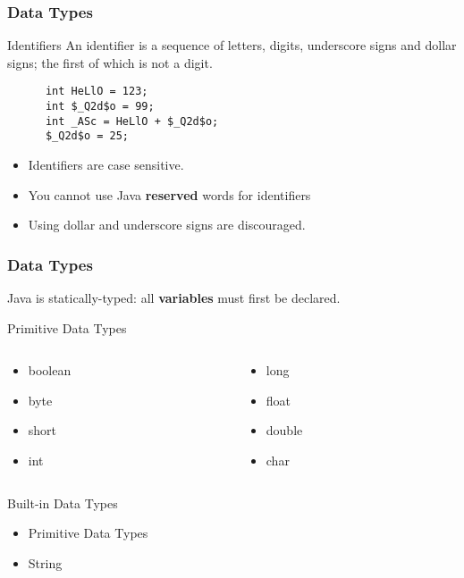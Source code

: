 \documentclass[10pt, compress]{beamer}
\begin{document}
\begin{frame}[fragile]
  \frametitle{Data Types}
  \begin{block}{Identifiers}
    An identifier is a sequence of letters, digits, underscore signs and dollar signs; the first of which is not a digit.
    \begin{verbatim}
      int HeLlO = 123;
      int $_Q2d$o = 99;
      int _ASc = HeLlO + $_Q2d$o;
      $_Q2d$o = 25;
    \end{verbatim}
  \end{block}
  \begin{itemize}
    \item[] Identifiers are case sensitive.
    \item[] You cannot use Java \textbf{reserved} words for identifiers
    \item[] Using dollar and underscore signs are discouraged.
  \end{itemize}
\end{frame}

\begin{frame}[fragile]
  \frametitle{Data Types}
  Java is statically-typed: all \textbf{variables} must first be declared.
  \begin{block}{Primitive Data Types}
    \begin{columns}
    \begin{column}{0.5\textwidth}
      \begin{itemize}
        \item[] boolean
        \item[] byte
        \item[] short
        \item[] int
      \end{itemize}
    \end{column}
    \begin{column}{0.5\textwidth}
      \begin{itemize}
        \item[] long
        \item[] float
        \item[] double
        \item[] char
      \end{itemize}
    \end{column}
    \end{columns}
  \end{block}
  \begin{block}{Built-in Data Types}
    \begin{itemize}
      \item[] Primitive Data Types
      \item[] String
    \end{itemize}
  \end{block}
\end{frame}
\end{document}

